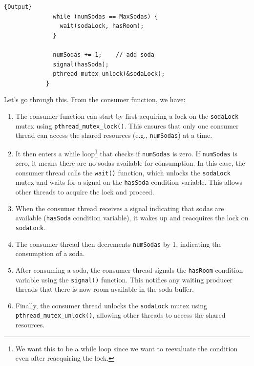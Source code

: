\documentclass{article}
\begin{document}
\begin{example}
\begin{enumerate}
\begin{minipage}{.49\linewidth}
\begin{lstlisting}[]{Output}
              while (numSodas == MaxSodas) {
                wait(sodaLock, hasRoom); 
              }

              numSodas += 1;    // add soda 
              signal(hasSoda);  
              pthread_mutex_unlock(&sodaLock); 
            }
          \end{lstlisting}
          \end{minipage}
      \end{enumerate}
      Let's go through this. From the consumer function, we have: 
      
      \begin{enumerate}
        \item The consumer function can start by first acquiring a lock on the \texttt{sodaLock} mutex using \texttt{pthread\_mutex\_lock()}. This ensures that only one consumer thread can access the shared resources (e.g., \texttt{numSodas}) at a time.

        \item It then enters a while loop\footnote{We want this to be a while loop since we want to reevaluate the condition even after reacquiring the lock. } that checks if \texttt{numSodas} is zero. If \texttt{numSodas} is zero, it means there are no sodas available for consumption. In this case, the consumer thread calls the \texttt{wait()} function, which unlocks the \texttt{sodaLock} mutex and waits for a signal on the \texttt{hasSoda} condition variable. This allows other threads to acquire the lock and proceed.

        \item When the consumer thread receives a signal indicating that sodas are available (\texttt{hasSoda} condition variable), it wakes up and reacquires the lock on \texttt{sodaLock}.

        \item The consumer thread then decrements \texttt{numSodas} by 1, indicating the consumption of a soda.

        \item After consuming a soda, the consumer thread signals the \texttt{hasRoom} condition variable using the \texttt{signal()} function. This notifies any waiting producer threads that there is now room available in the soda buffer.

        \item Finally, the consumer thread unlocks the \texttt{sodaLock} mutex using \texttt{pthread\_mutex\_unlock()}, allowing other threads to access the shared resources.
      \end{enumerate}
      

\end{example}
\end{document}
